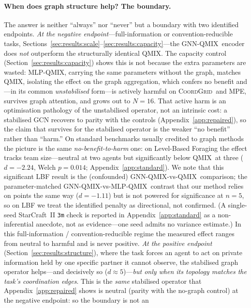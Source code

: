 \documentclass[10pt]{article}
\newcommand{\algoname}[1]{\textsc{#1}}
\newcommand{\qmix}{\algoname{QMIX}}
\newcommand{\gnnqmix}{\algoname{GNN-QMIX}}
\newcommand{\coordgrid}{\textsc{CoordGrid}}
\newcommand{\mlpqmix}{\algoname{MLP-QMIX}}
\begin{document}
\paragraph{When does graph structure help? The boundary.} The answer is
neither ``always'' nor ``never'' but a boundary with two identified
endpoints. \emph{At the negative endpoint}---full-information or
convention-reducible tasks, Sections~\ref{sec:results:scale}--\ref{sec:results:capacity}---the
\gnnqmix\ encoder does \emph{not} outperform the structurally identical
\qmix. The capacity control (Section~\ref{sec:results:capacity}) shows this
is not because the extra parameters are wasted: \mlpqmix, carrying the same
parameters without the graph, matches \qmix, isolating the effect on the
graph aggregation, which confers no benefit and---in its common
\emph{unstabilised} form---is actively harmful on \coordgrid\ and MPE,
survives graph attention, and grows out to $N{=}16$. That active harm is an
optimisation pathology of the unstabilised operator, not an intrinsic cost:
a stabilised GCN recovers to parity with the controls
(Appendix~\ref{app:repaired}), so the claim that survives for the stabilised
operator is the weaker ``no benefit'' rather than ``harm.'' On standard
benchmarks usually credited to graph methods the picture is the same
\emph{no-benefit-to-harm} one: on
Level-Based Foraging the effect tracks team size---neutral at two agents but
significantly below \qmix\ at three ($d=-2.24$, Welch $p=0.014$;
Appendix~\ref{app:standard}). We note that this significant LBF
result is the (confounded) \gnnqmix-vs-\qmix\ comparison; the parameter-matched
\gnnqmix-vs-\mlpqmix\ contrast that our method relies on points the same way
($d=-1.11$) but is not powered for significance at $n{=}5$, so on LBF we treat
the identified penalty as directional, not confirmed. (A single-seed StarCraft~II \texttt{3m} check
is reported in Appendix~\ref{app:standard} as a non-inferential anecdote, not
as evidence---one seed admits no variance estimate.) In this
full-information / convention-reducible regime the measured effect ranges from
neutral to harmful and is never positive.
\emph{At the positive endpoint} (Section~\ref{sec:results:structure}), where
the task forces an agent to act on private information held by one specific
partner it cannot observe, the stabilised graph operator helps---and
decisively so ($d\approx5$)---\emph{but only when its topology matches the
task's coordination edges}. This is the \emph{same} stabilised
operator that Appendix~\ref{app:repaired} shows is neutral (parity with the
no-graph control) at the negative endpoint: so the boundary is not an
\end{document}
